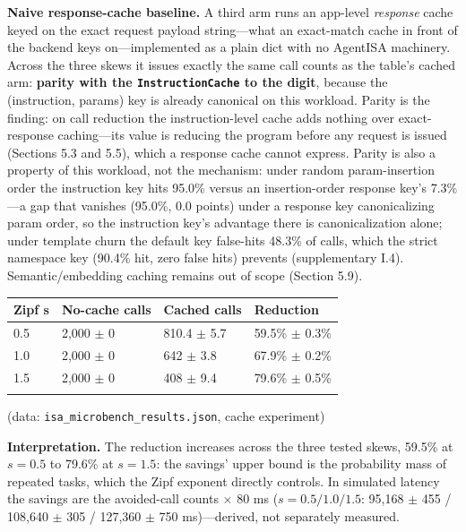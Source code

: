 \documentclass[
  sigconf,
  anonymous]{acmart}
\begin{document}
\textbf{Naive response-cache baseline.} A third arm runs an app-level
\emph{response} cache keyed on the exact request payload string---what
an exact-match cache in front of the backend keys on---implemented as a
plain dict with no AgentISA machinery. Across the three skews it issues
exactly the same call counts as the table's cached arm: \textbf{parity
with the \texttt{InstructionCache} to the digit}, because the
(instruction, params) key is already canonical on this workload. Parity
is the finding: on call reduction the instruction-level cache adds
nothing over exact-response caching---its value is reducing the program
before any request is issued (Sections 5.3 and 5.5), which a response
cache cannot express. Parity is also a property of this workload, not
the mechanism: under random param-insertion order the instruction key
hits 95.0\% versus an insertion-order response key's 7.3\%---a gap that
vanishes (95.0\%, 0.0 points) under a response key canonicalizing param
order, so the instruction key's advantage there is canonicalization
alone; under template churn the default key false-hits 48.3\% of calls,
which the strict namespace key (90.4\% hit, zero false hits) prevents
(supplementary I.4). Semantic/embedding caching remains out of scope
(Section 5.9).

\begin{table}[t]
\small\setlength{\tabcolsep}{3pt}
\begin{tabular}{@{}llll@{}}
\toprule\noalign{}
Zipf s & No-cache calls & Cached calls & Reduction \\
\midrule\noalign{}
0.5 & 2,000 \(\pm\) 0 & 810.4 \(\pm\) 5.7 & 59.5\% \(\pm\) 0.3\% \\
1.0 & 2,000 \(\pm\) 0 & 642 \(\pm\) 3.8 & 67.9\% \(\pm\) 0.2\% \\
1.5 & 2,000 \(\pm\) 0 & 408 \(\pm\) 9.4 & 79.6\% \(\pm\) 0.5\% \\
\bottomrule\noalign{}
\end{tabular}
\end{table}

(data: \texttt{isa\_microbench\_results.json}, cache experiment)

\textbf{Interpretation.} The reduction increases across the three tested
skews, 59.5\% at \(s = 0.5\) to 79.6\% at \(s = 1.5\): the savings'
upper bound is the probability mass of repeated tasks, which the Zipf
exponent directly controls. In simulated latency the savings are the
avoided-call counts \(\times\) 80 ms (\(s = 0.5/1.0/1.5\): 95,168
\(\pm\) 455 / 108,640 \(\pm\) 305 / 127,360 \(\pm\) 750 ms)---derived,
not separately measured.
\end{document}
